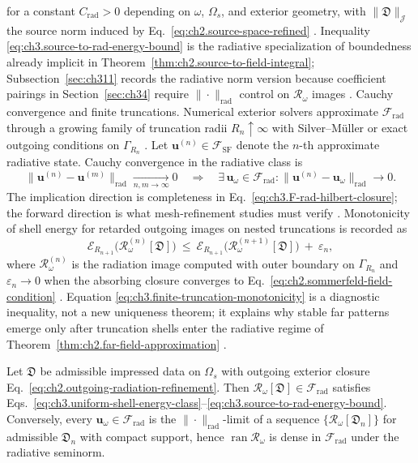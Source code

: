 for a constant \(C_{\mathrm{rad}}>0\) depending on \(\omega\), \(\Omega_s\), and exterior geometry, with
\(\|\mathfrak{D}\|_{\mathcal{J}}\) the source norm induced by
Eq.~\eqref{eq:ch2.source-space-refined} \cite{stratton1941}. Inequality
\eqref{eq:ch3.source-to-rad-energy-bound} is the radiative specialization of boundedness already implicit
in Theorem~\ref{thm:ch2.source-to-field-integral}; Subsection~\ref{sec:ch311} records the radiative norm
version because coefficient pairings in Section~\ref{sec:ch34} require \(\|\cdot\|_{\mathrm{rad}}\) control
on \(\mathcal{R}_\omega\) images \cite{hansen1988}.
Cauchy convergence and finite truncations. Numerical exterior solvers approximate \(\mathcal{F}_{\mathrm{rad}}\) through a growing family of
truncation radii \(R_{n}\uparrow\infty\) with Silver--M\"uller or exact outgoing conditions on
\(\Gamma_{R_n}\) \cite{stratton1941}. Let \(\mathbf{u}^{(n)}\in\mathcal{F}_{\mathrm{SF}}\)
denote the \(n\)-th approximate radiative state. Cauchy convergence in the radiative class is
\begin{equation}
\label{eq:ch3.cauchy-radiative-convergence}
\|\mathbf{u}^{(n)}-\mathbf{u}^{(m)}\|_{\mathrm{rad}}\xrightarrow[n,m\to\infty]{}0
\quad\Longrightarrow\quad
\exists\,\mathbf{u}_\omega\in\mathcal{F}_{\mathrm{rad}}:
\|\mathbf{u}^{(n)}-\mathbf{u}_\omega\|_{\mathrm{rad}}\to 0.
\end{equation}
The implication direction is completeness in Eq.~\eqref{eq:ch3.F-rad-hilbert-closure}; the forward
direction is what mesh-refinement studies must verify \cite{harrington2001}. Monotonicity of shell energy
for retarded outgoing images on nested truncations is recorded as
\begin{equation}
\label{eq:ch3.finite-truncation-monotonicity}
\mathcal{E}_{R_{n+1}}\!\big(\mathcal{R}_\omega^{(n)}[\mathfrak{D}]\big)
\ \le\
\mathcal{E}_{R_{n+1}}\!\big(\mathcal{R}_\omega^{(n+1)}[\mathfrak{D}]\big)
\ +\ \varepsilon_n,
\end{equation}
where \(\mathcal{R}_\omega^{(n)}\) is the radiation image computed with outer boundary on
\(\Gamma_{R_n}\) and \(\varepsilon_n\to 0\) when the absorbing closure converges to
Eq.~\eqref{eq:ch2.sommerfeld-field-condition} \cite{stratton1941}. Equation
\eqref{eq:ch3.finite-truncation-monotonicity} is a diagnostic inequality, not a new uniqueness theorem;
it explains why stable far patterns emerge only after truncation shells enter the radiative regime of
Theorem~\ref{thm:ch2.far-field-approximation} \cite{jackson1999}.
\begin{proposition}
\label{prop:ch3.finite-energy-closure}
Let \(\mathfrak{D}\) be admissible impressed data on \(\Omega_s\) with outgoing exterior closure
Eq.~\eqref{eq:ch2.outgoing-radiation-refinement}. Then \(\mathcal{R}_\omega[\mathfrak{D}]\in\mathcal{F}_{\mathrm{rad}}\)
satisfies Eqs.~\eqref{eq:ch3.uniform-shell-energy-class}--\eqref{eq:ch3.source-to-rad-energy-bound}. Conversely,
every \(\mathbf{u}_\omega\in\mathcal{F}_{\mathrm{rad}}\) is the \(\|\cdot\|_{\mathrm{rad}}\)-limit of a sequence
\(\{\mathcal{R}_\omega[\mathfrak{D}_n]\}\) for admissible \(\mathfrak{D}_n\) with compact support, hence
\(\operatorname{ran}\mathcal{R}_\omega\) is dense in \(\mathcal{F}_{\mathrm{rad}}\) under the radiative seminorm.
\end{proposition}

